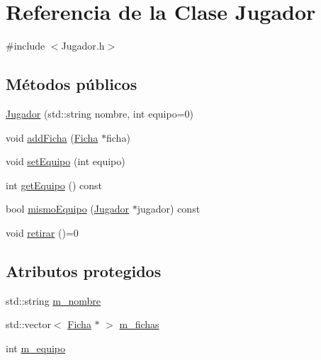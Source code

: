 \hypertarget{class_jugador}{\section{Referencia de la Clase Jugador}
\label{class_jugador}
}


{\ttfamily \#include $<$Jugador.\-h$>$}

\subsection*{Métodos públicos}
\begin{DoxyCompactItemize}
\item 
\hyperlink{class_jugador_a507b41f628794c6512f81f6caa887b97}{Jugador} (std\-::string nombre, int equipo=0)
\item 
void \hyperlink{class_jugador_af9d0efb95b52b56edd7e7d6cdfa77377}{add\-Ficha} (\hyperlink{class_ficha}{Ficha} $\ast$ficha)
\item 
void \hyperlink{class_jugador_a2a3f5c21a6b825ef46e72a465b25e1a9}{set\-Equipo} (int equipo)
\item 
int \hyperlink{class_jugador_a725214a9fd6122d62e7fc0d72005c932}{get\-Equipo} () const 
\item 
bool \hyperlink{class_jugador_a2874be23b93d3500b35b214b323a091d}{mismo\-Equipo} (\hyperlink{class_jugador}{Jugador} $\ast$jugador) const 
\item 
void \hyperlink{class_jugador_a7da404c1a34ab8355570e1a90b7ace84}{retirar} ()=0
\end{DoxyCompactItemize}
\subsection*{Atributos protegidos}
\begin{DoxyCompactItemize}
\item 
std\-::string \hyperlink{class_jugador_a1d5a997e6b8161fbb59705e4157612e5}{m\-\_\-nombre}
\item 
std\-::vector$<$ \hyperlink{class_ficha}{Ficha} $\ast$ $>$ \hyperlink{class_jugador_a2d8022d341e2c4f1ed4dd9b218c36662}{m\-\_\-fichas}
\item 
int \hyperlink{class_jugador_aed31247f7379b5ecd32469c5d014d5ad}{m\-\_\-equipo}
\end{DoxyCompactItemize}


